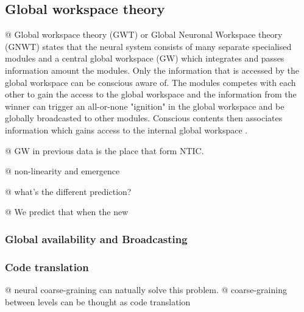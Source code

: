 \documentclass[utf8]{article}
\newenvironment{ants}
			{
			 \begin{easylist}[itemize]		
		 	}
			{
			\end{easylist}
			}
\begin{document}
		
		\subsection{Global workspace theory}
		
			\begin{ants}
				
				@ Global workspace theory (GWT)\cite{baars1988cognitive, baars1997theatre, baars2002conscious} or Global Neuronal Workspace theory (GNWT)\cite{dehaene1998neuronal, dehaene2001towards, dehaene2011experimental} states that the neural system consists of many separate specialised modules and a central global workspace (GW) which integrates and passes information amount the modules. Only the information that is accessed by the global workspace can be conscious aware of. The modules competes with each other to gain the access to the global workspace and the information from the winner can trigger an all-or-none "ignition" in the global workspace and be globally broadcasted to other modules. Conscious contents then associates information which gains access to the internal global workspace \cite{Dehaene2017}.
				
				
				@ GW in previous data is the place that form NTIC. 
				
				@ non-linearity and emergence
				
				@ what's the different prediction?
				
				@ We predict that when the new 
				
				
				
			\end{ants}
		
	
		
			\subsubsection{Global availability and Broadcasting}
			
			\subsubsection{Code translation}
				\begin{ants}
					@ neural coarse-graining can natually solve this problem. 
					@ coarse-graining between levels can be thought as code translation
				\end{ants}
			
			
\end{document}
